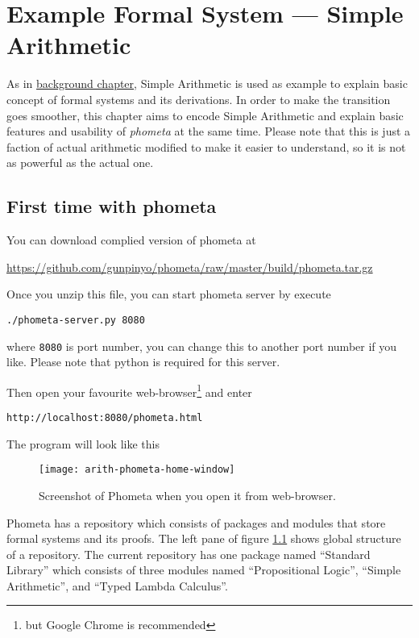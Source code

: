 \documentclass[master.tex]{subfiles}
\begin{document}
\chapter{Example Formal System --- Simple Arithmetic}
\label{chap:example_simple_arithmetic}

As in \hyperref[chap:background]{background chapter}, Simple Arithmetic is
used as example to explain basic concept of formal systems and its derivations.
In order to make the transition goes smoother, this chapter aims to encode
Simple Arithmetic and explain basic features and usability of \emph{phometa} at
the same time. Please note that this is just a faction of
actual arithmetic modified to make it easier to understand, so it is not as
powerful as the actual one.

\section{First time with phometa}

You can download complied version of phometa at

{\centering\url{https://github.com/gunpinyo/phometa/raw/master/build/phometa.tar.gz}}

Once you unzip this file, you can start phometa server by execute

\texttt{./phometa-server.py 8080}

where \texttt{8080} is port number, you can change this to another port number
if you like. Please note that python is required for this server.

Then open your favourite web-browser\footnote{but Google Chrome is recommended}
and enter

\texttt{http://localhost:8080/phometa.html}

The program will look like this

\begin{figure}[H]
    \centering
    \texttt{[image: arith-phometa-home-window]}
    \caption{Screenshot of Phometa when you open it from web-browser.}
\label{fig:arith-phometa-home-window}
\end{figure}

Phometa has a repository which consists of packages and modules that store
formal systems and its proofs. The left pane of figure
\ref{fig:arith-phometa-home-window} shows global structure of a repository. The
current repository has one package named ``Standard Library'' which consists of
three modules named ``Propositional Logic'', ``Simple Arithmetic'', and ``Typed
Lambda Calculus''.
\end{document}
